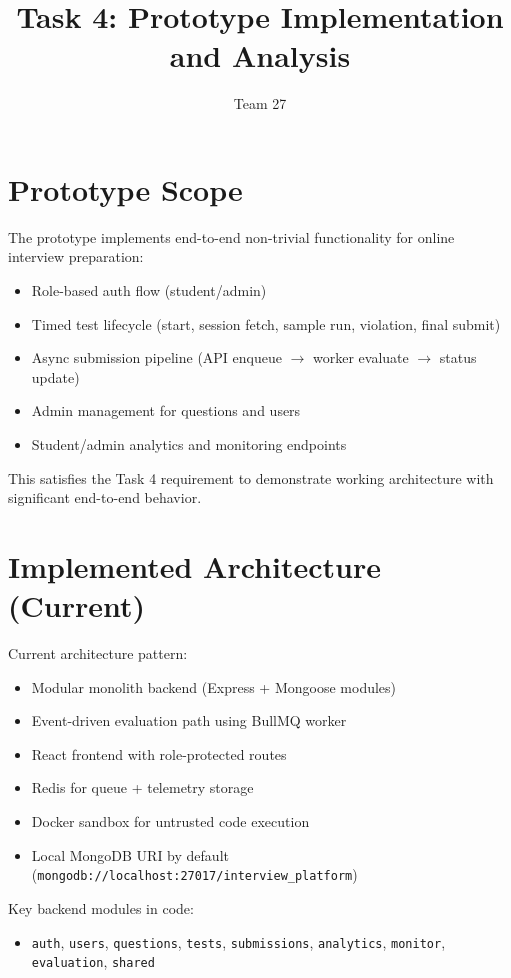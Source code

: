 \documentclass[12pt,journal,onecolumn]{IEEEtran}
\begin{document}
\title{Task 4: Prototype Implementation and Analysis}
\author{Team 27}
\maketitle

\section{Prototype Scope}

The prototype implements end-to-end non-trivial functionality for online interview preparation:

\begin{itemize}
    \item Role-based auth flow (student/admin)
    \item Timed test lifecycle (start, session fetch, sample run, violation, final submit)
    \item Async submission pipeline (API enqueue $\rightarrow$ worker evaluate $\rightarrow$ status update)
    \item Admin management for questions and users
    \item Student/admin analytics and monitoring endpoints
\end{itemize}

This satisfies the Task 4 requirement to demonstrate working architecture with significant end-to-end behavior.

\section{Implemented Architecture (Current)}

Current architecture pattern:
\begin{itemize}
    \item Modular monolith backend (Express + Mongoose modules)
    \item Event-driven evaluation path using BullMQ worker
    \item React frontend with role-protected routes
    \item Redis for queue + telemetry storage
    \item Docker sandbox for untrusted code execution
    \item Local MongoDB URI by default (\texttt{mongodb://localhost:27017/interview\_platform})
\end{itemize}

Key backend modules in code:
\begin{itemize}
    \item \texttt{auth}, \texttt{users}, \texttt{questions}, \texttt{tests}, \texttt{submissions}, \texttt{analytics}, \texttt{monitor}, \texttt{evaluation}, \texttt{shared}
\end{itemize}
\end{document}
